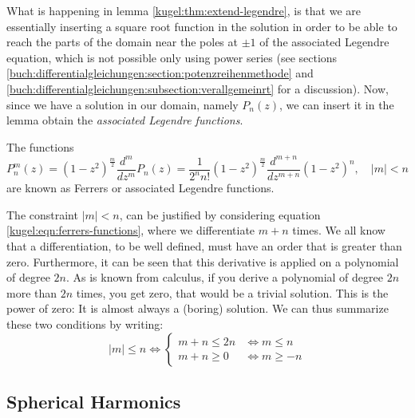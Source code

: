 What is happening in lemma \ref{kugel:thm:extend-legendre}, is that we are
essentially inserting a square root function in the solution in order to be able
to reach the parts of the domain near the poles at $\pm 1$ of the associated
Legendre equation, which is not possible only using power series (see sections
\ref{buch:differentialgleichungen:section:potenzreihenmethode} and
\ref{buch:differentialgleichungen:subsection:verallgemeinrt} for a discussion).
Now, since we have a solution in our domain, namely $P_n(z)$, we can insert it
in the lemma obtain the \emph{associated Legendre functions}.

\begin{definition}
  \label{kugel:def:ferrers-functions}
  The functions
  \begin{equation}
    \label{kugel:eqn:ferrers-functions}
    P^m_n (z) = (1-z^2)^{\frac{m}{2}}\frac{d^{m}}{dz^{m}} P_n(z)
      = \frac{1}{2^n n!}(1-z^2)^{\frac{m}{2}}
        \frac{d^{m+n}}{dz^{m+n}}(1-z^2)^n, \quad |m|<n
  \end{equation}
  are known as Ferrers or associated Legendre functions.
\end{definition}

The constraint $|m|<n$, can be justified by considering equation
\eqref{kugel:eqn:ferrers-functions}, where we differentiate $m+n$ times. We all
know that a differentiation, to be well defined, must have an order that is
greater than zero. Furthermore, it can be seen that this derivative is applied
on a polynomial of degree $2n$. As is known from calculus, if you derive a
polynomial of degree $2n$ more than $2n$ times, you get zero, that would be a
trivial solution. This is the power of zero: It is almost always a (boring)
solution. We can thus summarize these two conditions by writing:
\begin{equation*}
    |m| \leq n \iff
    \begin{cases}
        m+n \leq 2n &\iff m \leq n \\
        m+n \geq 0  &\iff m \geq -n
    \end{cases}
\end{equation*}

\subsection{Spherical Harmonics}

